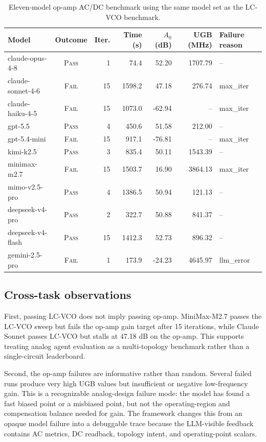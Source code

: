 \documentclass[acmsmall,review,anonymous]{acmart}
\newcommand{\pass}{\textsc{Pass}}
\newcommand{\fail}{\textsc{Fail}}
\begin{document}
\begin{table}[t]
  \centering
  \caption{Eleven-model op-amp AC/DC benchmark using the same model set as the
  LC-VCO benchmark.}
  \label{tab:opamp}
  \footnotesize
  \begin{tabular}{l c r r r r l}
    \toprule
    Model & Outcome & Iter. & Time (s) & $A_0$ (dB) & UGB (MHz) & Failure reason \\
    \midrule
    claude-opus-4-8   & \pass & 1  & 74.4   & 52.20  & 1707.79 & -- \\
    claude-sonnet-4-6 & \fail & 15 & 1598.2 & 47.18  & 276.74  & max\_iter \\
    claude-haiku-4-5  & \fail & 15 & 1073.0 & -62.94 & --      & max\_iter \\
    gpt-5.5           & \pass & 4  & 450.6  & 51.58  & 212.00  & -- \\
    gpt-5.4-mini      & \fail & 15 & 917.1  & -76.81 & --      & max\_iter \\
    kimi-k2.5         & \pass & 3  & 835.4  & 50.11  & 1543.39 & -- \\
    minimax-m2.7      & \fail & 15 & 1503.7 & 16.90  & 3864.13 & max\_iter \\
    mimo-v2.5-pro     & \pass & 4  & 1386.5 & 50.94  & 121.13  & -- \\
    deepseek-v4-pro   & \pass & 2  & 322.7  & 50.88  & 841.37  & -- \\
    deepseek-v4-flash & \pass & 15 & 1412.3 & 52.73  & 896.32  & -- \\
    gemini-2.5-pro    & \fail & 1  & 173.9  & -24.23 & 4645.97 & llm\_error \\
    \bottomrule
  \end{tabular}
\end{table}

\subsection{Cross-task observations}

First, passing LC-VCO does not imply passing op-amp. MiniMax-M2.7 passes the
LC-VCO sweep but fails the op-amp gain target after 15 iterations, while
Claude Sonnet passes LC-VCO but stalls at 47.18 dB on the op-amp. This
supports treating analog agent evaluation as a multi-topology benchmark rather
than a single-circuit leaderboard.

Second, the op-amp failures are informative rather than random. Several failed
runs produce very high UGB values but insufficient or negative low-frequency
gain. This is a recognizable analog-design failure mode: the model has found a
fast biased point or a misbiased point, but not the operating-region and
compensation balance needed for gain. The framework changes this from an
opaque model failure into a debuggable trace because the LLM-visible feedback
contains AC metrics, DC readback, topology intent, and operating-point scalars.
\end{document}
